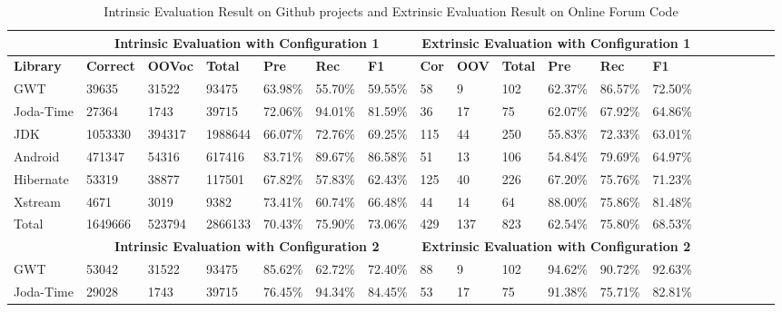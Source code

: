   \begin{table}[t]
  \tiny
  \centering
  \caption{Intrinsic Evaluation Result on Github projects and Extrinsic Evaluation Result on Online Forum Code}
\begin{tabular}{|l|l|l|l|l|l|l|l|l|l|l|l|l|l|l|l|l|l|l|}
\hline
          &  \multicolumn{6}{c|}{\textbf{Intrinsic Evaluation with Configuration 1}} &  \multicolumn{6}{c|}{\textbf{Extrinsic Evaluation with Configuration 1}}           \\
\hline
\textbf{Library}   & \textbf{Correct} & \textbf{OOVoc}  & \textbf{Total}   & \textbf{Pre} & \textbf{Rec}  & \textbf{F1} & \textbf{Cor} & \textbf{OOV}  & \textbf{Total}   & \textbf{Pre} & \textbf{Rec}  & \textbf{F1} \\ \hline
GWT       & 39635    & 31522  & 93475   & 63.98\%   & 55.70\% & 59.55\%   & 58              & 9     & 102   & 62.37\%   & 86.57\% & 72.50\%  \\ \hline
Joda-Time & 27364      & 1743   & 39715   & 72.06\%   & 94.01\% & 81.59\%  & 36             & 17    & 75    & 62.07\%   & 67.92\% & 64.86\%  \\ \hline
JDK       & 1053330   & 394317 & 1988644 & 66.07\%   & 72.76\% & 69.25\% & 115            & 44    & 250   & 55.83\%   & 72.33\% & 63.01\%  \\ \hline
Android   & 471347     & 54316  & 617416  & 83.71\%   & 89.67\% & 86.58\% & 51             & 13    & 106   & 54.84\%   & 79.69\% & 64.97\%  \\ \hline
Hibernate & 53319      & 38877  & 117501  & 67.82\%   & 57.83\% & 62.43\% & 125            & 40    & 226   & 67.20\%   & 75.76\% & 71.23\%  \\ \hline
Xstream   & 4671      & 3019   & 9382    & 73.41\%   & 60.74\% & 66.48\%  & 44             & 14    & 64    & 88.00\%   & 75.86\% & 81.48\%  \\ \hline
Total     & 1649666   & 523794 & 2866133 & 70.43\%   & 75.90\% & 73.06\%   & 429           & 137   & 823   & 62.54\%   & 75.80\% & 68.53\%  \\ \hline
          & \multicolumn{6}{c|}{\textbf{Intrinsic Evaluation with Configuration 2}}  & \multicolumn{6}{c|}{\textbf{Extrinsic Evaluation with Configuration 2}}   \\
\hline
GWT       & 53042                                     & 31522  & 93475   & 85.62\%   & 62.72\% & 72.40\%    & 88              & 9     & 102   & 94.62\%   & 90.72\% & 92.63\%  \\ \hline
Joda-Time & 29028                                     & 1743   & 39715   & 76.45\%   & 94.34\% & 84.45\%  & 53             & 17    & 75    & 91.38\%   & 75.71\% & 82.81\% \\

\end{tabular}
\end{table}
